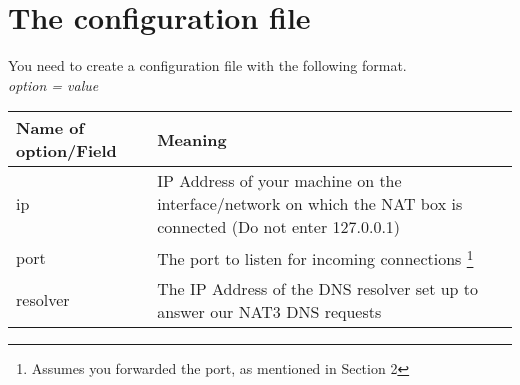 \section {The configuration file}

You need to create a configuration file with the following format.  \\

\textit{option = value}\\

\begin{minipage}{\textwidth}
\begin{tabular}{| l | p{4in} |}
\hline
Name of option/Field & Meaning \\
\hline
\hline
ip       & IP Address of your machine on the interface/network on which the NAT box is connected (Do not enter 127.0.0.1) \\
\hline
port     & The port to listen for incoming connections \footnote[1]{Assumes you forwarded the port, as mentioned in Section 2}  \\
\hline
resolver &  The IP Address of the DNS resolver set up to answer our NAT3 DNS requests\\
\hline
\end{tabular}
\end{minipage}
